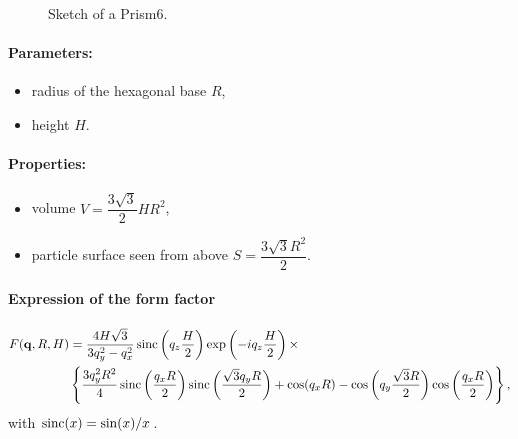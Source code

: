 \begin{figure}[ht]
\hfill
{}
\hfill
{}
\hfill
\caption{Sketch of a Prism6.}
\label{fig:prism6}
\end{figure}

\FloatBarrier

\paragraph{Parameters:}
\begin{itemize}
\item radius of the hexagonal base $R$,
\item height $H$.
\end{itemize}

\paragraph{Properties:}
\begin{itemize}
\item volume $V = \dfrac{3\sqrt{3}}{2}H R^2$,
\item particle surface seen from above $S =\dfrac{3\sqrt{3}R^2}{2}$.
\end{itemize}

\paragraph{Expression of the form factor}
\begin{align*}
F(\mathbf{q}, R, H) &= \frac{4H\sqrt{3}}{3q_y^2 - q_x^2}
\operatorname{sinc}\left(q_z\frac{H}{2}\right) \exp\left(-i q_z\frac{ H}{2}\right)\times\\
&\left\{\frac{3q_y^2R^2}{4} \operatorname{sinc}\left(\frac{q_x
  R}{2}\right)\operatorname{sinc}\left(\frac{\sqrt{3}q_yR }{2}\right)+ \cos(q_x R)-\cos\left(q_y
\frac{\sqrt{3}R}{2}\right) \cos\left(\frac{q_x R}{2}\right)\right\},
\end{align*}
with $\operatorname{sinc}(x)=\sin(x)/x$.

